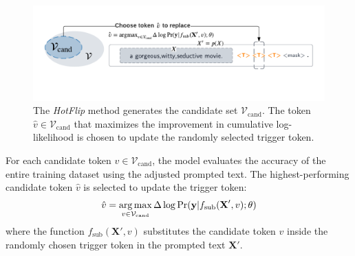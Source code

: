 \begin{figure}[!ht]
    \centering
    \includegraphics[width=\hsize]{figures/implementation_media/impl-auto-prompting.pdf}
    \caption{The \textit{HotFlip} method generates the candidate set $\mathcal{V}_{\text{cand}}$. The token $\hat{v} \in \mathcal{V}_{\text{cand}}$ that maximizes the improvement in cumulative log-likelihood is chosen to update the randomly selected trigger token.}
    \label{fig:impl-auto-prompt}
\end{figure}

For each candidate token $v \in \mathcal{V}_{\text{cand}}$, the model evaluates the accuracy of the entire training dataset using the adjusted prompted text. The highest-performing candidate token $\hat{v}$ is selected to update the trigger token:
\begin{equation}
    \hat{v} = \operatorname*{arg\,max}_{v \in \mathcal{V}_{\text{cand}}} \Delta \log \Pr(\textbf{y} | f_{\text{sub}}(\textbf{X}', v); \theta)
\end{equation}
where the function $f_{\text{sub}}(\textbf{X}', v)$ substitutes the candidate token $v$ inside the randomly chosen trigger token in the prompted text $\textbf{X}'$. 

